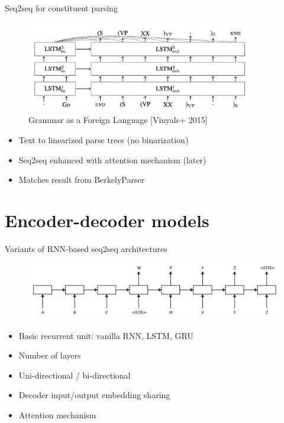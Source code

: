 \documentclass[usenames,dvipsnames,11pt,aspectratio=169]{beamer}
\begin{document}
\begin{frame}
    {Seq2seq for constituent parsing}
    \begin{figure}
        \includegraphics[height=4cm]{figures/parsing-s2s}
        \caption{Grammar as a Foreign Language [Vinyals+ 2015]}
    \end{figure}
    \begin{itemize}
        \item Text to linearized parse trees (no binarization)
        \item Seq2seq enhanced with attention mechanism (later)
        \item Matches result from BerkelyParser 
    \end{itemize}
\end{frame}

\section{Encoder-decoder models}

\begin{frame}
    {Variants of RNN-based seq2seq architectures}
    \begin{figure}
        \includegraphics[height=2.5cm]{figures/s2s-ilya}
    \end{figure}
    \begin{itemize}
        \item Basic recurrent unit: vanilla RNN, LSTM, GRU
        \item Number of layers
        \item Uni-directional / bi-directional
        \item Decoder input/output embedding sharing
        \item Attention mechanism
    \end{itemize}
\end{frame}
\end{document}
